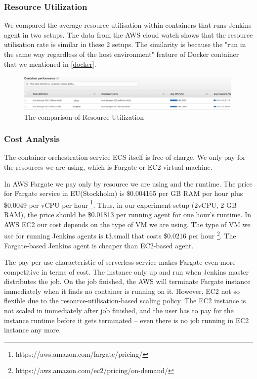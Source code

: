 \subsubsection{Resource Utilization}
We compared the average resource utilisation within containers that runs Jenkins agent in two setups. The data from the AWS cloud watch shows that the resource utilisation rate is similar in these 2 setups. The similarity is because the "run in the same way regardless of the host environment" \cite{WhatisaC60:online} feature of Docker container that we mentioned in \ref{docker}.
\begin{figure}[h]
\centering
\includegraphics[width=0.99\textwidth]{pics/utilizationecs.png}
\caption{The comparison of Resource Utilization}
\label{fig:utilizationecs}
\end{figure}
\subsubsection{Cost Analysis}
The container orchestration service ECS itself is free of charge. We only pay for the resources we are using, which is Fargate or EC2 virtual machine.
\par
In AWS Fargate we pay only by resource we are using and the runtime. The price for Fargate service in EU(Stockholm) is \$0.004165 per GB RAM per hour plus \$0.0049 per vCPU per hour \footnote{https://aws.amazon.com/fargate/pricing/}. Thus, in our experiment setup (2vCPU, 2 GB RAM), the price should be \$0.01813 per running agent for one hour's runtime.
In AWS EC2 our cost depends on the type of VM we are using. The type of VM we use for running Jenkins agents is t3.small that costs \$0.0216 per hour \footnote{https://aws.amazon.com/ec2/pricing/on-demand/}. The Fargate-based Jenkins agent is cheaper than EC2-based agent.
\par
The pay-per-use characteristic of serverless service makes Fargate even more competitive in terms of cost. The instance only up and run when Jenkins master distributes the job. On the job finished, the AWS will terminate Fargate instance immediately when it finds no container is running on it. However, EC2 not so flexible due to the resource-utilisation-based scaling policy. The EC2 instance is not scaled in immediately after job finished, and the user has to pay for the instance runtime before it gets terminated -- even there is no job running in EC2 instance any more.
